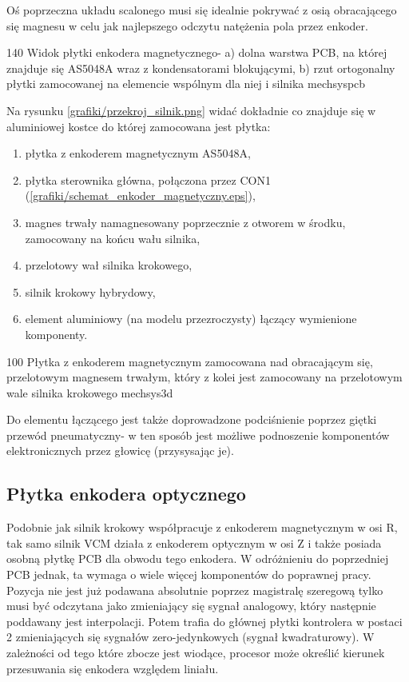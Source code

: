 Oś poprzeczna układu scalonego musi się idealnie pokrywać z osią obracającego się magnesu w celu jak najlepszego odczytu natężenia pola przez enkoder.

	{140}
	{Widok płytki enkodera magnetycznego- a) dolna warstwa PCB, na której znajduje się AS5048A wraz z kondensatorami blokującymi, b) rzut ortogonalny płytki zamocowanej na elemencie wspólnym dla niej i silnika}
	{mechsyspcb}
	
Na rysunku \ref{grafiki/przekroj_silnik.png} widać dokładnie co znajduje się w aluminiowej kostce do której zamocowana jest płytka:

\begin{enumerate}
	\item płytka z enkoderem magnetycznym AS5048A,
	\item płytka sterownika główna, połączona przez CON1 (\ref{grafiki/schemat_enkoder_magnetyczny.eps}),
	\item magnes trwały namagnesowany poprzecznie z otworem w środku, zamocowany na końcu wału silnika,
	\item przelotowy wał silnika krokowego,
	\item silnik krokowy hybrydowy,
	\item element aluminiowy (na modelu przezroczysty) łączący wymienione komponenty.
\end{enumerate}
	
	{100}
	{Płytka z enkoderem magnetycznym zamocowana nad obracającym się, przelotowym magnesem trwałym, który z kolei jest zamocowany na przelotowym wale silnika krokowego}
	{mechsys3d}
	
Do elementu łączącego jest także doprowadzone podciśnienie poprzez giętki przewód pneumatyczny- w ten sposób jest możliwe podnoszenie komponentów elektronicznych przez głowicę (przysysając je).
	
\subsection{Płytka enkodera optycznego}
\label{ss:encopt}

Podobnie jak silnik krokowy współpracuje z enkoderem magnetycznym w osi R, tak samo silnik VCM działa z enkoderem optycznym w osi Z i także posiada osobną płytkę PCB dla obwodu tego enkodera. W odróżnieniu do poprzedniej PCB jednak, ta wymaga o wiele więcej komponentów do poprawnej pracy. Pozycja nie jest już podawana absolutnie poprzez magistralę szeregową tylko musi być odczytana jako zmieniający się sygnał analogowy, który następnie poddawany jest interpolacji. Potem trafia do głównej płytki kontrolera w postaci 2 zmieniających się sygnałów zero-jedynkowych (sygnał kwadraturowy). W zależności od tego które zbocze jest wiodące, procesor może określić kierunek przesuwania się enkodera względem liniału. \\

